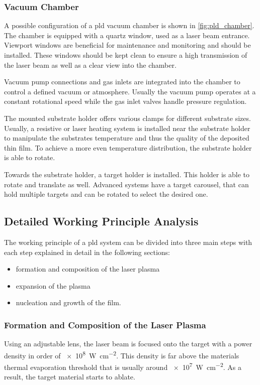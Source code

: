 \subsubsection{Vacuum Chamber}
A possible configuration of a \ac{pld} vacuum chamber is shown in 
\cref{fig:pld_chamber}.
The chamber is equipped with a quartz window, used as a laser beam entrance.
Viewport windows are beneficial for maintenance and monitoring and should
be installed.
These windows should be kept clean to ensure a high transmission of the laser beam
as well as a clear view into the chamber.

Vacuum pump connections and gas inlets are integrated into the chamber
to control a defined vacuum or atmosphere.
Usually the vacuum pump operates at a constant rotational speed while the 
gas inlet valves handle pressure regulation. 

The mounted substrate holder offers various clamps for different substrate sizes.
Usually, a resistive or laser heating system is installed near the substrate holder to
manipulate the substrates temperature and thus the quality of the deposited thin film.
To achieve a more even temperature distribution, the substrate holder is able to rotate.

Towards the substrate holder, a target holder is installed.
This holder is able to rotate and translate as well.
Advanced systems have a target carousel, that can hold multiple targets and can be
rotated to select the desired one.

\subsection{Detailed Working Principle Analysis}
The working principle of a \ac{pld} system can be divided into three main steps with
each step explained in detail in the following sections:
\begin{itemize}
	\item formation and composition of the laser plasma
	\item expansion of the plasma
	\item nucleation and growth of the film.
\end{itemize}



\subsubsection{Formation and Composition of the Laser Plasma}
Using an adjustable lens, the laser beam is focused onto the target 
with a power density in order of \qty{e8}{\watt\per\centi\meter\squared}.
This density is far above the materials thermal evaporation threshold that is usually 
around \qty{e7}{\watt\per\centi\meter\squared}.
As a result, the target material starts to ablate.

